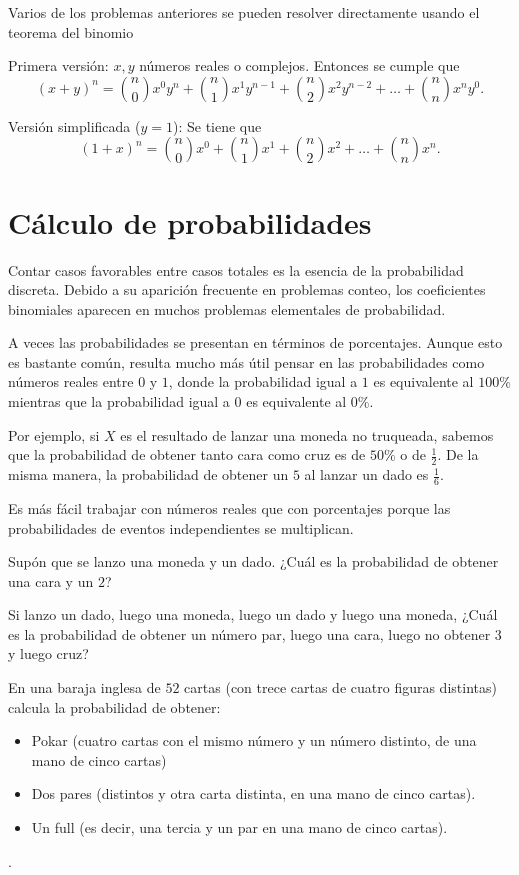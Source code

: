 \newpage

Varios de los problemas anteriores se pueden resolver directamente usando el teorema del binomio

\begin{teorema}

Primera versión: $x,y$ números reales o complejos. Entonces se cumple que
$$(x+y)^n={n\choose 0}x^0y^n+{n\choose 1}x^1y^{n-1}+{n\choose 2}x^2y^{n-2}+\dots +{n\choose n}x^ny^0.$$

Versión simplificada ($y=1$): Se tiene que $$(1+x)^n={n\choose 0}x^0+{n\choose 1}x^1+{n\choose 2}x^2+\dots +{n\choose n}x^n.$$
\end{teorema}

\section{Cálculo de probabilidades}

Contar casos favorables entre casos totales es la esencia de la probabilidad discreta. Debido a su aparición frecuente en problemas conteo, los coeficientes binomiales aparecen en muchos problemas elementales de probabilidad.

A veces las probabilidades se presentan en términos de porcentajes. Aunque esto es bastante común, resulta mucho más útil pensar en las probabilidades como números reales entre $0$ y $1$, donde la probabilidad igual a $1$ es equivalente al $100\%$ mientras que la probabilidad igual a $0$ es equivalente al $0\%$.

Por ejemplo, si $X$ es el resultado de lanzar una moneda no truqueada, sabemos que la probabilidad de obtener tanto cara como cruz es de $50\%$ o de $\frac{1}{2}$. De la misma manera, la probabilidad de obtener un $5$ al lanzar un dado es $\frac{1}{6}$.

Es más fácil trabajar con números reales que con porcentajes porque las probabilidades de eventos independientes se multiplican.

Supón que se lanzo una moneda y un dado. ¿Cuál es la probabilidad de obtener una cara y un $2$?

Si lanzo un dado, luego una moneda, luego un dado y luego una moneda, ¿Cuál es la probabilidad de obtener un número par, luego una cara, luego no obtener 3 y luego cruz? 
\vspace{4cm}

\begin{ejercicio} 
En una baraja inglesa de $52$ cartas (con trece cartas de cuatro figuras distintas) calcula la probabilidad de obtener: 
\begin{itemize}
    \item Pokar (cuatro cartas con el mismo número y un número distinto, de una mano de cinco cartas)
    \item Dos pares (distintos y otra carta distinta, en una mano de cinco cartas).
    \item Un full (es decir, una tercia y un par en una mano de cinco cartas).
\end{itemize}.
\end{ejercicio}
\vspace{4cm}

